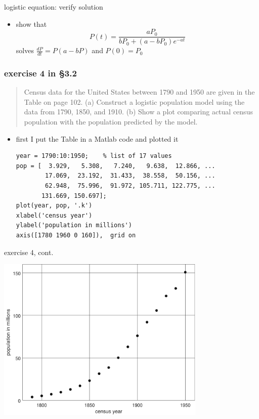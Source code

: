 \documentclass[colorlinks]{beamer}
\begin{document}
\begin{frame}{logistic equation: verify solution}

\begin{itemize}
\item show that
    $$P(t)=\frac{aP_0}{bP_0+(a-bP_0) e^{-at}}$$
solves $\frac{dP}{dt} = P \left(a-bP\right)$ and $P(0)=P_0$
\end{itemize}

\vspace{50mm}
\end{frame}


\begin{frame}[fragile]

\frametitle{exercise 4 in \S3.2}

\small
\begin{quotation}
\noindent Census data for the United States between 1790 and 1950 are given in the Table on page 102.  (a)   Construct a logistic population model using the data from 1790, 1850, and 1910.  (b)  Show a plot comparing actual census population with the population predicted by the model.
\end{quotation}

\normalsize
\begin{itemize}
\item first I put the Table in a Matlab code and plotted it

\medskip
\begin{Verbatim}[fontsize=\footnotesize,xleftmargin=7mm]
year = 1790:10:1950;    % list of 17 values
pop = [  3.929,   5.308,   7.240,   9.638,  12.866, ...
        17.069,  23.192,  31.433,  38.558,  50.156, ...
        62.948,  75.996,  91.972, 105.711, 122.775, ...
       131.669, 150.697];
plot(year, pop, '.k')
xlabel('census year')
ylabel('population in millions')
axis([1780 1960 0 160]),  grid on
\end{Verbatim}
\end{itemize}
\end{frame}


\begin{frame}{exercise 4, cont.}

\begin{center}
\includegraphics[width=0.75\textwidth]{figs/plotcensus}
\end{center}
\end{frame}
\end{document}
